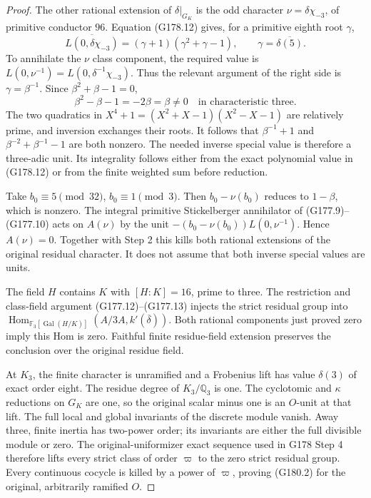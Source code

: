 \begin{proof}
The other rational extension of $\delta|_{G_K}$ is the odd
character $\nu=\delta\chi_{-3}$, of primitive conductor $96$.
Equation (G178.12) gives, for a primitive eighth root $\gamma$,
\[
 \overline{L(0,\delta\chi_{-3})}
       =(\gamma+1)(\gamma^2+\gamma-1),
                    \qquad\gamma=\overline{\delta(5)}.
 \tag{G180.6}
\]
To annihilate the $\nu$ class component, the required value is
$L(0,\nu^{-1})=L(0,\delta^{-1}\chi_{-3})$.
Thus the relevant argument of the right side is $\gamma=\beta^{-1}$.
Since $\beta^2+\beta-1=0$,
\[
   \beta^2-\beta-1=-2\beta=\beta\ne0
                                  \quad\text{in characteristic three}.
 \tag{G180.7}
\]
The two quadratics in
$X^4+1=(X^2+X-1)(X^2-X-1)$ are relatively prime,
and inversion exchanges their roots.
It follows that $\beta^{-1}+1$ and
$\beta^{-2}+\beta^{-1}-1$ are both nonzero.
The needed inverse special value is therefore a three-adic unit.
Its integrality follows either from the exact polynomial value
in (G178.12) or from the finite weighted sum before reduction.

Take $b_0\equiv5\pmod{32}$, $b_0\equiv1\pmod3$.
Then $b_0-\nu(b_0)$ reduces to $1-\beta$, which is nonzero.
The integral primitive Stickelberger annihilator of (G177.9)--(G177.10)
acts on $A(\nu)$ by the unit
$-(b_0-\nu(b_0))L(0,\nu^{-1})$.
Hence $A(\nu)=0$.
Together with Step 2 this kills both rational extensions of the
original residual character.  It does not assume that both
inverse special values are units.

The field $H$ contains $K$ with $[H:K]=16$, prime to three.
The restriction and class-field argument (G177.12)--(G177.13)
injects the strict residual group into
$\operatorname{Hom}_{\mathbb F_3[\operatorname{Gal}(H/K)]}
(A/3A,k'(\overline\delta))$.
Both rational components just proved zero imply this Hom is zero.
Faithful finite residue-field extension preserves the conclusion
over the original residue field.

At $K_3$, the finite character is unramified and a Frobenius lift
has value $\delta(3)$ of exact order eight.
The residue degree of $K_3/\mathbb Q_3$ is one.
The cyclotomic and $\kappa$ reductions on $G_K$ are one,
so the original scalar minus one is an $O$-unit at that lift.
The full local and global invariants of the discrete module vanish.
Away three, finite inertia has two-power order; its invariants
are either the full divisible module or zero.
The original-uniformizer exact sequence used in G178 Step 4 therefore
lifts every strict class of order $\varpi$ to the zero strict
residual group.  Every continuous cocycle is killed by a power of
$\varpi$, proving (G180.2) for the original, arbitrarily ramified $O$.


\end{proof}
